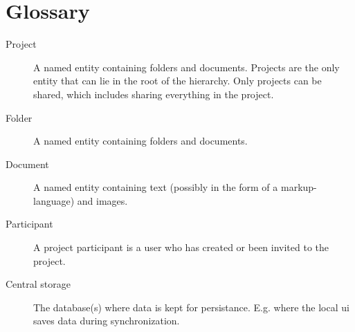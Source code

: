 \section{Glossary}
\label{sec:glossary}

\begin{description}
    \item[Project] A named entity containing folders and documents. Projects are the only entity that
        can lie in the root of the hierarchy. Only projects can be shared, which includes sharing
        everything in the project.
    \item[Folder] A named entity containing folders and documents.
    \item[Document] A named entity containing text (possibly in the form of a markup-language) and images.
    \item[Participant] A project participant is a user who has created or been invited to the project.
    \item[Central storage] The database(s) where data is kept for persistance. E.g. where the local ui saves data during synchronization.
\end{description}
